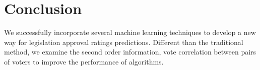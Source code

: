 \documentclass{article} %
\begin{document}
\section{Conclusion}
We successfully incorporate several machine learning techniques to develop a new way for legislation approval ratings predictions. Different than the traditional method, we examine the second order information, vote correlation between pairs of voters to improve the performance of algorithms.  



\end{document}
